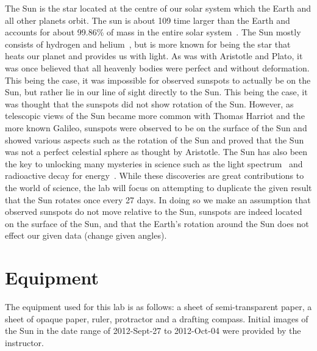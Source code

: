 \documentclass{article}
\begin{document}
The Sun is the star located at the centre of our solar system which the Earth and all other planets orbit. The sun is about 109 time larger 
than the Earth and accounts for about 99.86\% of mass in the entire solar system~\cite{Wolf:2000}. The Sun mostly consists of hydrogen
and helium~\cite{Basu:2008}, but is more known for being the star that heats our planet and provides us with light. As was with Aristotle
and Plato, it was once believed that all heavenly bodies were perfect and without deformation. This being the case, it was impossible
for observed sunspots to actually be on the Sun, but rather lie in our line of sight directly to the Sun. This being the case, it was thought
that the sunspots did not show rotation of the Sun. However, as telescopic views of the Sun became more common with Thomas Harriot
and the more known Galileo, sunspots were observed to be on the surface of the Sun and showed various aspects such as the rotation
of the Sun and proved that the Sun was not a perfect celestial sphere as thought by Aristotle. The Sun has also been the key to unlocking
many mysteries in science such as the light spectrum~\cite{BBC:2006} and radioactive decay for energy~\cite{Darden:1998}. While these
discoveries are great contributions to the world of science, the lab will focus on attempting to duplicate the given result that the Sun
rotates once every 27 days. In doing so we make an assumption that observed sunspots do not move relative to the Sun, sunspots are
indeed located on the surface of the Sun, and that the Earth's rotation around the Sun does not effect our given data (change given
angles).\\


\section{Equipment}

The equipment used for this lab is as follows: a sheet of semi-transparent paper,  a sheet of opaque paper, ruler, protractor and
 a drafting compass. Initial images of the Sun in the date range of 2012-Sept-27 to 2012-Oct-04 were provided by the instructor.\\

\end{document}
